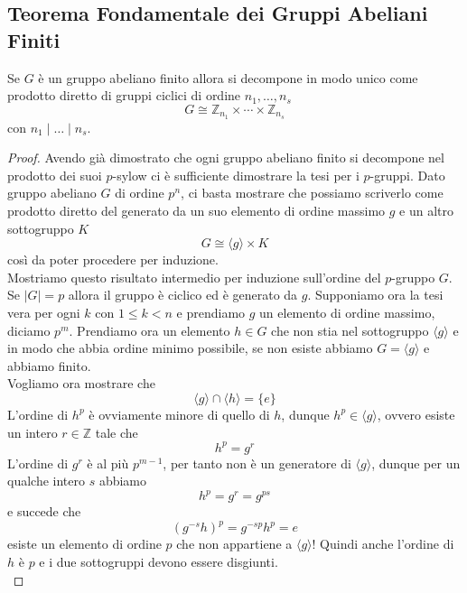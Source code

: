\subsection{Teorema Fondamentale dei Gruppi Abeliani Finiti}
\begin{multicols}{2}
\begin{theorem}\label{tfgaf}
	Se $ G $ è un gruppo abeliano finito allora si decompone in modo unico come prodotto diretto di gruppi ciclici di ordine $ n_1, \dots, n_s $ \[ G \cong \mathbb{Z}_{n_1} \times \cdots \times \mathbb{Z}_{n_s} \] con $ n_1 \mid \dots \mid n_s $.
\end{theorem}
\begin{proof}
	Avendo già dimostrato che ogni gruppo abeliano finito si decompone nel prodotto dei suoi $ p $-sylow ci è sufficiente dimostrare la tesi per i $ p $-gruppi. Dato gruppo abeliano $ G $ di ordine $ p^n $, ci basta mostrare che possiamo scriverlo come prodotto diretto del generato da un suo elemento di ordine massimo $ g $ e un altro sottogruppo $ K $
	\[ G \cong \langle g \rangle \times K \]
	così da poter procedere per induzione. \\
	
	Mostriamo questo risultato intermedio per induzione sull'ordine del $ p $-gruppo $ G $. Se $ |G|=p $ allora il gruppo è ciclico ed è generato da $ g $. Supponiamo ora la tesi vera per ogni $ k $ con $ 1 \leq k < n $ e prendiamo $ g $ un elemento di ordine massimo, diciamo $ p^m $. Prendiamo ora un elemento $ h \in G  $ che non stia nel sottogruppo $ \langle g \rangle $ e in modo che abbia ordine minimo possibile, se non esiste abbiamo $ G = \langle g \rangle $ e abbiamo finito. \\
	
	Vogliamo ora mostrare che 
	\[ \langle g \rangle \cap \langle h \rangle = \{e\} \]
	L'ordine di $ h^p $ è ovviamente minore di quello di $ h $, dunque $ h^p \in \langle g \rangle $, ovvero esiste un intero $ r \in \mathbb{Z} $ tale che
	\[ h^p = g^r \]
	L'ordine di $ g^r $ è al più $ p^{m-1} $, per tanto non è un generatore di $ \langle g \rangle $, dunque per un qualche intero $ s $ abbiamo
	\[ h^p = g^r = g^{ps} \]
	e succede che 
	\[ (g^{-s}h)^p = g^{-sp}h^p = e \]
	esiste un elemento di ordine $ p $ che non appartiene a $ \langle g \rangle $! Quindi anche l'ordine di $ h $ è $ p $ e i due sottogruppi devono essere disgiunti. \\
	

\end{proof}
\end{multicols}
